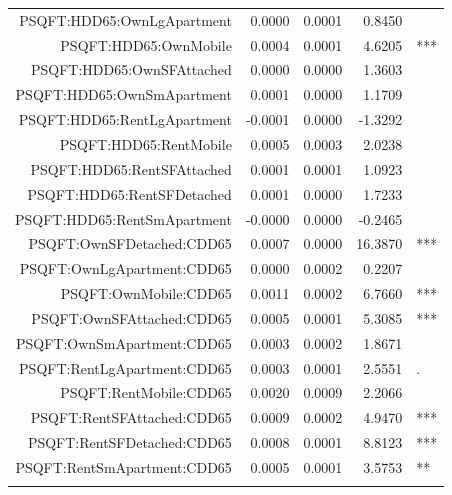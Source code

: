 \documentclass{article}
\begin{document}
{\begin{longtable}{rrrrl}
  PSQFT:HDD65:OwnLgApartment & 0.0000 & 0.0001 & 0.8450 &   \\ 
  PSQFT:HDD65:OwnMobile & 0.0004 & 0.0001 & 4.6205 & *** \\ 
  PSQFT:HDD65:OwnSFAttached & 0.0000 & 0.0000 & 1.3603 &   \\ 
  PSQFT:HDD65:OwnSmApartment & 0.0001 & 0.0000 & 1.1709 &   \\ 
  PSQFT:HDD65:RentLgApartment & -0.0001 & 0.0000 & -1.3292 &   \\ 
  PSQFT:HDD65:RentMobile & 0.0005 & 0.0003 & 2.0238 &   \\ 
  PSQFT:HDD65:RentSFAttached & 0.0001 & 0.0001 & 1.0923 &   \\ 
  PSQFT:HDD65:RentSFDetached & 0.0001 & 0.0000 & 1.7233 &   \\ 
  PSQFT:HDD65:RentSmApartment & -0.0000 & 0.0000 & -0.2465 &   \\ 
  PSQFT:OwnSFDetached:CDD65 & 0.0007 & 0.0000 & 16.3870 & *** \\ 
  PSQFT:OwnLgApartment:CDD65 & 0.0000 & 0.0002 & 0.2207 &   \\ 
  PSQFT:OwnMobile:CDD65 & 0.0011 & 0.0002 & 6.7660 & *** \\ 
  PSQFT:OwnSFAttached:CDD65 & 0.0005 & 0.0001 & 5.3085 & *** \\ 
  PSQFT:OwnSmApartment:CDD65 & 0.0003 & 0.0002 & 1.8671 &   \\ 
  PSQFT:RentLgApartment:CDD65 & 0.0003 & 0.0001 & 2.5551 & . \\ 
  PSQFT:RentMobile:CDD65 & 0.0020 & 0.0009 & 2.2066 &   \\ 
  PSQFT:RentSFAttached:CDD65 & 0.0009 & 0.0002 & 4.9470 & *** \\ 
  PSQFT:RentSFDetached:CDD65 & 0.0008 & 0.0001 & 8.8123 & *** \\ 
  PSQFT:RentSmApartment:CDD65 & 0.0005 & 0.0001 & 3.5753 & ** \\ 
   \hline
\hline
\label{tab:SystemKWH}
\end{longtable}
}
\end{document}
